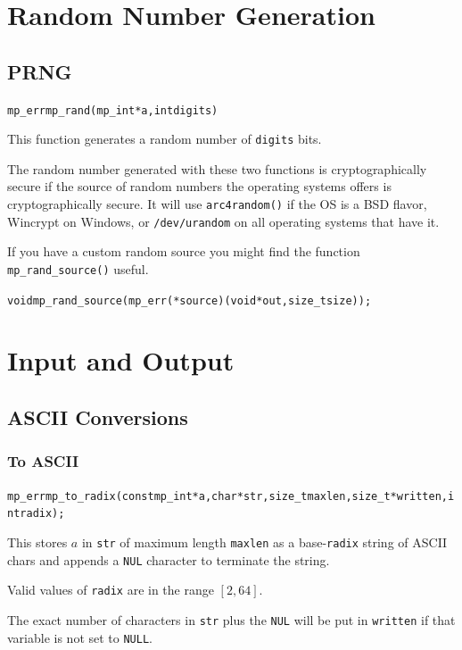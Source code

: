 \documentclass[synpaper]{book}
\begin{document}
\chapter{Random Number Generation}
\section{PRNG}
\begin{alltt}
mp_err mp_rand(mp_int *a, int digits)
\end{alltt}
This function generates a random number of \texttt{digits} bits.

The random number generated with these two functions is cryptographically secure if the source of
random numbers the operating systems offers is cryptographically secure. It will use
\texttt{arc4random()} if the OS is a BSD flavor, Wincrypt on Windows, or \texttt{/dev/urandom} on
all operating systems that have it.

If you have a custom random source you might find the function \texttt{mp\_rand\_source()} useful.
\begin{alltt}
void mp_rand_source(mp_err(*source)(void *out, size_t size));
\end{alltt}


\chapter{Input and Output}
\section{ASCII Conversions}
\subsection{To ASCII}
\begin{alltt}
mp_err mp_to_radix (const mp_int *a, char *str, size_t maxlen, size_t *written, int radix);
\end{alltt}
This stores $a$ in \texttt{str} of maximum length \texttt{maxlen} as a base-\texttt{radix} string
of ASCII chars and appends a \texttt{NUL} character to terminate the string.

Valid values of \texttt{radix} are in the range $[2, 64]$.

The exact number of characters in \texttt{str} plus the \texttt{NUL} will be put in
\texttt{written} if that variable is not set to \texttt{NULL}.
\end{document}
